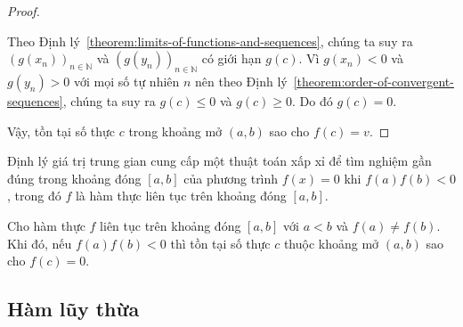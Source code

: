 \begin{proof}
\begin{enumerate}[label={\textbf{Khả năng \arabic*.}},itemindent=1.5cm]
              Theo Định lý~\ref{theorem:limits-of-functions-and-sequences}, chúng ta suy ra ${(g(x_{n}))}_{n\in\mathbb{N}}$ và ${(g(y_{n}))}_{n\in\mathbb{N}}$ có giới hạn $g(c)$. Vì $g(x_{n}) < 0$ và $g(y_{n}) > 0$ với mọi số tự nhiên $n$ nên theo Định lý~\ref{theorem:order-of-convergent-sequences}, chúng ta suy ra $g(c)\leq 0$ và $g(c)\geq 0$. Do đó $g(c) = 0$.
    \end{enumerate}

    Vậy, tồn tại số thực $c$ trong khoảng mở $(a, b)$ sao cho $f(c) = v$.
\end{proof}

Định lý giá trị trung gian cung cấp một thuật toán xấp xỉ để tìm nghiệm gần đúng trong khoảng đóng $[a, b]$ của phương trình $f(x) = 0$ khi $f(a)f(b) < 0$, trong đó $f$ là hàm thực liên tục trên khoảng đóng $[a, b]$.

\begin{corollary}
    Cho hàm thực $f$ liên tục trên khoảng đóng $[a, b]$ với $a < b$ và $f(a)\ne f(b)$. Khi đó, nếu $f(a)f(b) < 0$ thì tồn tại số thực $c$ thuộc khoảng mở $(a, b)$ sao cho $f(c) = 0$.
\end{corollary}

\subsection{Hàm lũy thừa}

\begin{definition}
\end{definition}

\begin{theorem}
\end{theorem}

\begin{definition}
\end{definition}

\begin{theorem}
\end{theorem}

\begin{definition}
\end{definition}

\begin{theorem}
\end{theorem}

\begin{definition}
\end{definition}

